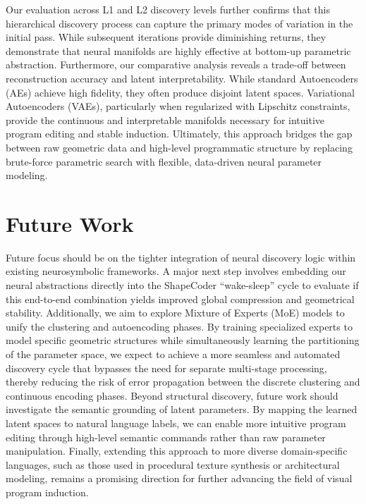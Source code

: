 \documentclass{thesis}
\begin{document}
Our evaluation across L1 and L2 discovery levels further confirms that this hierarchical discovery process can capture the primary modes of variation in the initial pass. While subsequent iterations provide diminishing returns, they demonstrate that neural manifolds are highly effective at bottom-up parametric abstraction. Furthermore, our comparative analysis reveals a trade-off between reconstruction accuracy and latent interpretability. While standard Autoencoders (AEs) achieve high fidelity, they often produce disjoint latent spaces. Variational Autoencoders (VAEs), particularly when regularized with Lipschitz constraints, provide the continuous and interpretable manifolds necessary for intuitive program editing and stable induction. Ultimately, this approach bridges the gap between raw geometric data and high-level programmatic structure by replacing brute-force parametric search with flexible, data-driven neural parameter modeling.

\section{Future Work}

Future focus should be on the tighter integration of neural discovery logic within existing neurosymbolic frameworks. A major next step involves embedding our neural abstractions directly into the ShapeCoder ``wake-sleep'' cycle to evaluate if this end-to-end combination yields improved global compression and geometrical stability. Additionally, we aim to explore Mixture of Experts (MoE) models to unify the clustering and autoencoding phases. By training specialized experts to model specific geometric structures while simultaneously learning the partitioning of the parameter space, we expect to achieve a more seamless and automated discovery cycle that bypasses the need for separate multi-stage processing, thereby reducing the risk of error propagation between the discrete clustering and continuous encoding phases. Beyond structural discovery, future work should investigate the semantic grounding of latent parameters. By mapping the learned latent spaces to natural language labels, we can enable more intuitive program editing through high-level semantic commands rather than raw parameter manipulation. Finally, extending this approach to more diverse domain-specific languages, such as those used in procedural texture synthesis or architectural modeling, remains a promising direction for further advancing the field of visual program induction.

\cleardoublepage

\backmatter
{}
{}
\begingroup
\setlength{\emergencystretch}{8em}
\printbibliography{}
\endgroup

\cleardoublepage
{}
{}
\printindex
\cleardoublepage
\end{document}
